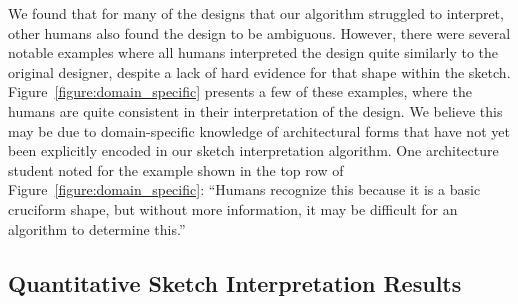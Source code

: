 We found that for many of the designs that our algorithm struggled to
interpret, other humans also found the design to be ambiguous.
However, there were several notable examples where all humans
interpreted the design quite similarly to the original designer,
despite a lack of hard evidence for that shape within the sketch.
Figure~\ref{figure:domain_specific} presents a few of these examples,
where the humans are quite consistent in their interpretation of the
design.  We believe this may be due to domain-specific knowledge of
architectural forms that have not yet been explicitly encoded in our
sketch interpretation algorithm.
%
One architecture student noted for the example shown in the top row of
Figure~\ref{figure:domain_specific}: ``Humans recognize this because it
is a basic cruciform shape, but without more information, it may be
difficult for an algorithm to determine this.''


\subsection{Quantitative Sketch Interpretation Results}

